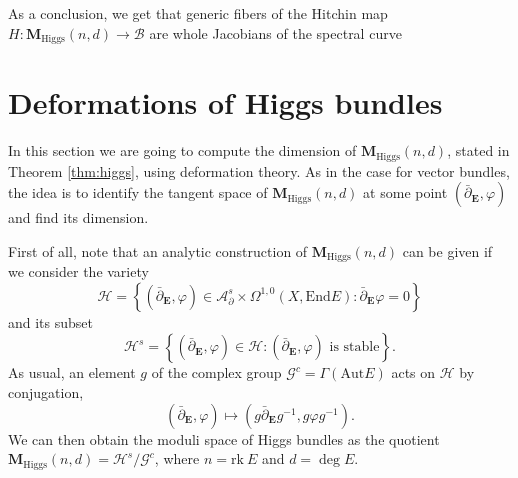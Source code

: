 \documentclass[12pt,a4paper]{book}
\theoremstyle{definition} \newtheorem{defn}[thm]{Definition}
\theoremstyle{definition} \newtheorem{ejemplo}[thm]{Example}
\theoremstyle{remark} \newtheorem{rem}[thm]{Remark}
\def\AA{\mathscr{A}}
\def\BB{\mathscr{B}}
\def\HH{\mathscr{H}}
\def\GG{\mathscr{G}}
\def\rk{\mathrm{rk}}
\def\End{\mathrm{End}}
\def\Aut{\mathrm{Aut}}
\def\Hig{\mathbf{M}_{\mathrm{Higgs}}}
\def\delbar{\bar{\partial}}
\newcommand{\ve}[1]{\mathbf{#1}}
\begin{document}
	    As a conclusion, we get that generic fibers of the Hitchin map $H:\Hig(n,d) \rightarrow \BB$ are whole Jacobians of the spectral curve

	    \section{Deformations of Higgs bundles}
	    In this section we are going to compute the dimension of $\Hig(n,d)$, stated in Theorem \ref{thm:higgs}, using deformation theory. As in the case for vector bundles, the idea is to identify the tangent space of $\Hig(n,d)$ at some point $(\delbar_{\ve{E}},\varphi)$ and find its dimension.

	    First of all, note that an analytic construction of $\Hig(n,d)$ can be given if we consider the variety
	    \begin{equation*}
	     \HH= \left\{(\delbar_{\ve{E}},\varphi) \in\AA^s_\partial \times \Omega^{1,0}(X,\End E) : \delbar_{\ve{E}}\varphi=0 \right\}
	    \end{equation*}
	    and its subset
	    \begin{equation*}
	      \HH^s=\left\{ (\delbar_{\ve{E}},\varphi) \in \HH : (\delbar_{\ve{E}},\varphi) \text{ is stable} \right\}      .
	    \end{equation*}
	    As usual, an element $g$ of the complex group $\GG^c=\Gamma(\Aut E)$ acts on $\HH$ by conjugation,
	    \begin{equation*}
	      (\delbar_{\ve{E}},\varphi) \mapsto (g\delbar_{\ve{E}}g^{-1},g\varphi g^{-1}).
	    \end{equation*}
	    We can then obtain the moduli space of Higgs bundles as the quotient $\Hig(n,d)=\HH^s/\GG^c$, where $n=\rk\ E$ and $d= \deg E$.
\end{document}
